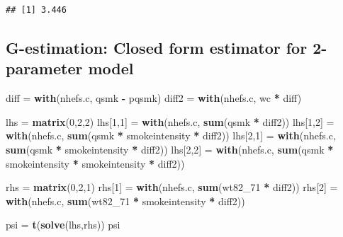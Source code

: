 \documentclass[
  10pt,
]{book}
\newenvironment{Shaded}{\begin{snugshade}}{\end{snugshade}}
\newcommand{\DecValTok}[1]{\textcolor[rgb]{0.00,0.00,0.81}{#1}}
\newcommand{\KeywordTok}[1]{\textcolor[rgb]{0.13,0.29,0.53}{\textbf{#1}}}
\newcommand{\NormalTok}[1]{#1}
\newcommand{\OperatorTok}[1]{\textcolor[rgb]{0.81,0.36,0.00}{\textbf{#1}}}
\newcommand{\StringTok}[1]{\textcolor[rgb]{0.31,0.60,0.02}{#1}}
\begin{document}
\begin{verbatim}
## [1] 3.446
\end{verbatim}

\hypertarget{g-estimation-closed-form-estimator-for-2-parameter-model}{%
\subsection{G-estimation: Closed form estimator for 2-parameter model}\label{g-estimation-closed-form-estimator-for-2-parameter-model}}

\begin{Shaded}
\begin{Highlighting}[]
\NormalTok{diff =}\StringTok{ }\KeywordTok{with}\NormalTok{(nhefs.c, qsmk }\OperatorTok{{-}}\StringTok{ }\NormalTok{pqsmk)}
\NormalTok{diff2 =}\StringTok{ }\KeywordTok{with}\NormalTok{(nhefs.c, wc }\OperatorTok{*}\StringTok{ }\NormalTok{diff)}

\NormalTok{lhs =}\StringTok{ }\KeywordTok{matrix}\NormalTok{(}\DecValTok{0}\NormalTok{,}\DecValTok{2}\NormalTok{,}\DecValTok{2}\NormalTok{)}
\NormalTok{lhs[}\DecValTok{1}\NormalTok{,}\DecValTok{1}\NormalTok{] =}\StringTok{ }\KeywordTok{with}\NormalTok{(nhefs.c, }\KeywordTok{sum}\NormalTok{(qsmk }\OperatorTok{*}\StringTok{ }\NormalTok{diff2))}
\NormalTok{lhs[}\DecValTok{1}\NormalTok{,}\DecValTok{2}\NormalTok{] =}\StringTok{ }\KeywordTok{with}\NormalTok{(nhefs.c, }\KeywordTok{sum}\NormalTok{(qsmk }\OperatorTok{*}\StringTok{ }\NormalTok{smokeintensity  }\OperatorTok{*}\StringTok{ }\NormalTok{diff2))}
\NormalTok{lhs[}\DecValTok{2}\NormalTok{,}\DecValTok{1}\NormalTok{] =}\StringTok{ }\KeywordTok{with}\NormalTok{(nhefs.c, }\KeywordTok{sum}\NormalTok{(qsmk }\OperatorTok{*}\StringTok{ }\NormalTok{smokeintensity }\OperatorTok{*}\StringTok{ }\NormalTok{diff2))}
\NormalTok{lhs[}\DecValTok{2}\NormalTok{,}\DecValTok{2}\NormalTok{] =}\StringTok{ }\KeywordTok{with}\NormalTok{(nhefs.c, }\KeywordTok{sum}\NormalTok{(qsmk }\OperatorTok{*}\StringTok{ }\NormalTok{smokeintensity }\OperatorTok{*}\StringTok{ }\NormalTok{smokeintensity }\OperatorTok{*}\StringTok{ }\NormalTok{diff2))}

\NormalTok{rhs =}\StringTok{ }\KeywordTok{matrix}\NormalTok{(}\DecValTok{0}\NormalTok{,}\DecValTok{2}\NormalTok{,}\DecValTok{1}\NormalTok{)}
\NormalTok{rhs[}\DecValTok{1}\NormalTok{] =}\StringTok{ }\KeywordTok{with}\NormalTok{(nhefs.c, }\KeywordTok{sum}\NormalTok{(wt82\_}\DecValTok{71} \OperatorTok{*}\StringTok{ }\NormalTok{diff2))}
\NormalTok{rhs[}\DecValTok{2}\NormalTok{] =}\StringTok{ }\KeywordTok{with}\NormalTok{(nhefs.c, }\KeywordTok{sum}\NormalTok{(wt82\_}\DecValTok{71} \OperatorTok{*}\StringTok{ }\NormalTok{smokeintensity }\OperatorTok{*}\StringTok{ }\NormalTok{diff2))}

\NormalTok{psi =}\StringTok{ }\KeywordTok{t}\NormalTok{(}\KeywordTok{solve}\NormalTok{(lhs,rhs))}
\NormalTok{psi}
\end{Highlighting}
\end{Shaded}
\end{document}
